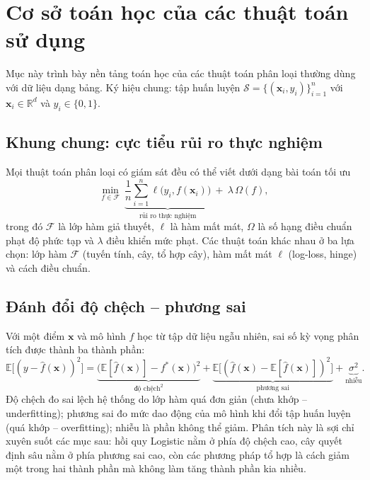 \documentclass[12pt,a4paper,oneside]{report}
\begin{document}
\section{Cơ sở toán học của các thuật toán sử dụng}
\label{sec:cosotoan}

Mục này trình bày nền tảng toán học của các thuật toán phân loại thường dùng
với dữ liệu dạng bảng.
Ký hiệu chung: tập huấn luyện $\mathcal{S} = \{(\mathbf{x}_i, y_i)\}_{i=1}^{n}$
với $\mathbf{x}_i \in \mathbb{R}^{d}$ và $y_i \in \{0, 1\}$.

\subsection{Khung chung: cực tiểu rủi ro thực nghiệm}
Mọi thuật toán phân loại có giám sát đều có thể viết dưới dạng bài toán tối ưu
\begin{equation}
  \min_{f \in \mathcal{F}}\ \underbrace{\frac{1}{n}\sum_{i=1}^{n}
  \ell\big(y_i, f(\mathbf{x}_i)\big)}_{\text{rủi ro thực nghiệm}}
  \ +\ \lambda\, \Omega(f),
  \label{eq:erm}
\end{equation}
trong đó $\mathcal{F}$ là lớp hàm giả thuyết, $\ell$ là hàm mất mát, $\Omega$ là
số hạng điều chuẩn phạt độ phức tạp và $\lambda$ điều khiển mức phạt. Các thuật
toán khác nhau ở ba lựa chọn: lớp hàm $\mathcal{F}$ (tuyến tính, cây, tổ hợp
cây), hàm mất mát $\ell$ (log-loss, hinge) và cách điều chuẩn.

\subsection{Đánh đổi độ chệch -- phương sai}
\label{sec:biasvariance}
Với một điểm $\mathbf{x}$ và mô hình $\hat{f}$ học từ tập dữ liệu ngẫu nhiên,
sai số kỳ vọng phân tích được thành ba thành phần:
\begin{equation}
  \mathbb{E}\big[(y - \hat{f}(\mathbf{x}))^2\big] =
  \underbrace{\big(\mathbb{E}[\hat{f}(\mathbf{x})] - f^{*}(\mathbf{x})\big)^{2}}_{\text{độ chệch}^2}
  + \underbrace{\mathbb{E}\big[(\hat{f}(\mathbf{x}) - \mathbb{E}[\hat{f}(\mathbf{x})])^{2}\big]}_{\text{phương sai}}
  + \underbrace{\sigma^{2}}_{\text{nhiễu}} .
  \label{eq:biasvar}
\end{equation}
Độ chệch đo sai lệch hệ thống do lớp hàm quá đơn giản (chưa khớp --
underfitting); phương sai đo mức dao động của mô hình khi đổi tập huấn
luyện (quá khớp -- overfitting); nhiễu là phần không thể giảm. Phân tích này là
sợi chỉ xuyên suốt các mục sau: hồi quy Logistic nằm ở phía độ chệch cao, cây
quyết định sâu nằm ở phía phương sai cao, còn các phương pháp tổ hợp là cách
giảm một trong hai thành phần mà không làm tăng thành phần kia nhiều.
\end{document}
